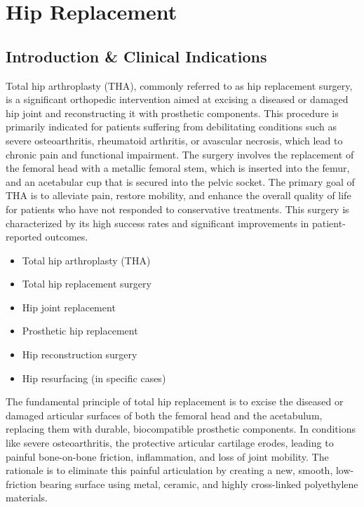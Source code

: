 \chapter{Hip Replacement}

\section*{Introduction \& Clinical Indications}
Total hip arthroplasty (THA), commonly referred to as hip replacement surgery, is a significant orthopedic intervention aimed at excising a diseased or damaged hip joint and reconstructing it with prosthetic components. This procedure is primarily indicated for patients suffering from debilitating conditions such as severe osteoarthritis, rheumatoid arthritis, or avascular necrosis, which lead to chronic pain and functional impairment. The surgery involves the replacement of the femoral head with a metallic femoral stem, which is inserted into the femur, and an acetabular cup that is secured into the pelvic socket. The primary goal of THA is to alleviate pain, restore mobility, and enhance the overall quality of life for patients who have not responded to conservative treatments. This surgery is characterized by its high success rates and significant improvements in patient-reported outcomes.

\begin{itemize}
  \item Total hip arthroplasty (THA)
  \item Total hip replacement surgery
  \item Hip joint replacement
  \item Prosthetic hip replacement
  \item Hip reconstruction surgery
  \item Hip resurfacing (in specific cases)
\end{itemize}

The fundamental principle of total hip replacement is to excise the diseased or damaged articular surfaces of both the femoral head and the acetabulum, replacing them with durable, biocompatible prosthetic components. In conditions like severe osteoarthritis, the protective articular cartilage erodes, leading to painful bone-on-bone friction, inflammation, and loss of joint mobility. The rationale is to eliminate this painful articulation by creating a new, smooth, low-friction bearing surface using metal, ceramic, and highly cross-linked polyethylene materials.

